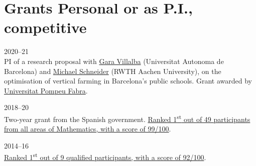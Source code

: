 \section*{Grants {\small Personal or as P.I., competitive}}

\begin{paracol}{2}
  2020--21
\switchcolumn
  \\
  PI of a research proposal with \href{https://ictaweb.uab.cat/personal_detail.php?id=8}{Gara Villalba} (Universitat Autonoma de Barcelona) and \href{https://www.dpo.rwth-aachen.de/cms/DPO/Der-Lehrstuhl/Team/Lehrstuhlleitung/~nwkh/Michael-Schneider/}{Michael Schneider} (RWTH Aachen University), on the optimisation of vertical farming in Barcelona's public schools.
  Grant awarded by \href{https://www.upf.edu/}{Universitat Pompeu Fabra}.
\end{paracol}

\begin{paracol}{2}
  2018--20
\switchcolumn
  \\
  Two-year grant from the Spanish government.
  \href{https://santini.in/files/cv/jdc17.pdf}{Ranked 1\textsuperscript{st} out of 49 participants from all areas of Mathematics, with a score of 99/100}.
\end{paracol}

\begin{paracol}{2}
  2014--16
\switchcolumn
  \\
  \href{https://santini.in/files/cv/phd14.pdf}{Ranked 1\textsuperscript{st} out of 9 qualified participants, with a score of 92/100}.
\end{paracol}